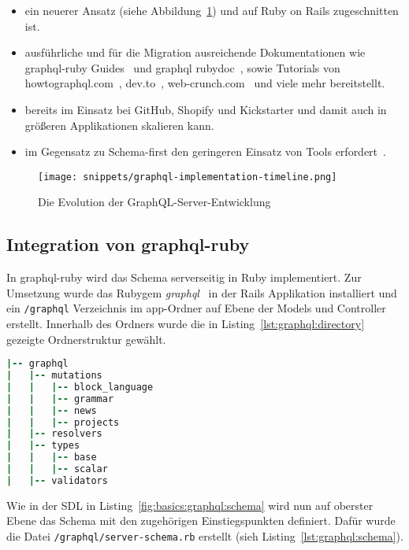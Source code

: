 \begin{description}
\begin{itemize}
	\setlength\itemsep{-1em}
	\item ein neuerer Ansatz (siehe Abbildung~\ref{graphql:evolution}) und auf Ruby on Rails zugeschnitten ist.
	\item ausführliche und für die Migration ausreichende Dokumentationen wie graphql-ruby Guides~\cite{graphql-ruby-guides} und graphql rubydoc~\cite{graphql-rubydoc}, sowie Tutorials von howtographql.com~\cite{howto-graphql-ruby}, dev.to~\cite{dev.to-graphql-ruby}, web-crunch.com~\cite{web-crunch-graphql-ruby} und viele mehr bereitstellt.
	\item bereits im Einsatz bei GitHub, Shopify und Kickstarter und damit auch in größeren Applikationen skalieren kann.
	\item im Gegensatz zu Schema-first den geringeren Einsatz von Tools erfordert~\cite{schema-first-tooling}.

\end{itemize}
\end{description}

\begin{figure}[h!]
	\centering
	\texttt{[image: snippets/graphql-implementation-timeline.png]}
	\caption{Die Evolution der GraphQL-Server-Entwicklung ~\cite{graphql-evolution-graphic}}
	\label{graphql:evolution}
\end{figure}

\subsection{Integration von graphql-ruby}
In graphql-ruby wird das Schema serverseitig in Ruby implementiert.
Zur Umsetzung wurde das Rubygem \emph{graphql}~\cite{graphql-rubygem} in der Rails Applikation installiert und ein \texttt{/graphql} Verzeichnis im app-Ordner auf Ebene der Models und Controller erstellt.
Innerhalb des Ordners wurde die in Listing~\ref{lst:graphql:directory} gezeigte Ordnerstruktur gewählt.

\begin{lstlisting}[language=Ruby,float=h!,caption={Ordnerstruktur des \texttt{/graphql} Verzeichnisses}, label={lst:graphql:directory}]
|-- graphql
|   |-- mutations
|   |   |-- block_language
|   |   |-- grammar
|   |   |-- news
|   |   |-- projects
|   |-- resolvers
|   |-- types
|   |   |-- base
|   |   |-- scalar
|   |-- validators
\end{lstlisting}

Wie in der SDL in Listing~\ref{fig:basics:graphql:schema} wird nun auf oberster Ebene das Schema mit den zugehörigen Einstiegspunkten definiert. Dafür wurde die Datei \lstinline|/graphql/server-schema.rb| erstellt (sieh Listing~\ref{lst:graphql:schema}).

